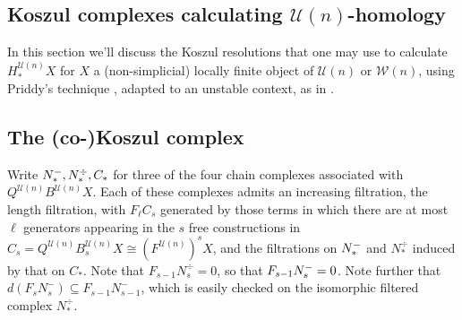 \documentclass[11pt]{amsart}
\theoremstyle{plain}
\theoremstyle{definition}
\newcommand{\calW}{\mathcal{W}}
\newcommand{\calU}{\mathcal{U}}
\theoremstyle{plain}
\newcommand{\Nop}{N^{\smash{-}}}
\begin{document}
\begin{Koszul complexes}
\vfil\pagebreak

\section{\textbf{Koszul complexes calculating $\calU(n)$-homology}}
In this section we'll discuss the Koszul resolutions that one may use to calculate $H_*^{\calU(n)}X$ for $X$ a (non-simplicial) locally finite object of $\calU(n)$ or $\calW(n)$, using Priddy's technique \cite{PriddyKoszul.pdf}, adapted to an unstable context, as in \cite{CurtisSimplicialHtpy.pdf}.

\subsection{The (co-)Koszul complex}
Write $\Nop_*,N_*^\div,C_*$ for three of the four chain complexes associated with $Q^{\calU(n)}B^{\calU(n)}X$. Each of these complexes admits an increasing filtration, the length filtration, with $F_\ell C_s$ generated by those terms in which there are at most $\ell$ generators appearing in the $s$ free constructions in $C_s= Q^{\calU(n)}B^{\calU(n)}_sX\cong (F^{\calU(n)})^sX$, and the filtrations on $\Nop_*$ and $N^\div_*$ induced by that on $C_*$. Note that $F_{s-1}N^\div_s=0$, so that  $F_{s-1}\Nop_s=0$. Note further that $d(F_sN_s^-)\subseteq F_{s-1}N_{s-1}^-$, which is easily checked on the isomorphic filtered complex $N_*^\div$.


\end{Koszul complexes}
\end{document}
